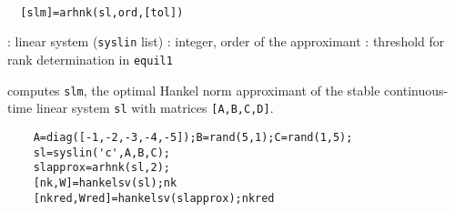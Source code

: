 \begin{mandesc}
   \\ %
\end{mandesc}
\begin{calling_sequence}
\begin{verbatim}
  [slm]=arhnk(sl,ord,[tol])     
\end{verbatim}
\end{calling_sequence}
\begin{parameters}
  \begin{varlist}
    : linear system (\verb!syslin! list)
    : integer, order of the approximant
    : threshold for rank determination in \verb!equil1!
  \end{varlist}
\end{parameters}
\begin{mandescription}
  computes \verb!slm!, the optimal Hankel norm approximant of the stable
  continuous-time linear system \verb!sl! with matrices \verb![A,B,C,D]!.
\end{mandescription}
\begin{examples}
  \begin{Verbatim}
    A=diag([-1,-2,-3,-4,-5]);B=rand(5,1);C=rand(1,5);
    sl=syslin('c',A,B,C);
    slapprox=arhnk(sl,2);
    [nk,W]=hankelsv(sl);nk
    [nkred,Wred]=hankelsv(slapprox);nkred
  \end{Verbatim}
\end{examples}
\begin{manseealso}
      
\end{manseealso}
